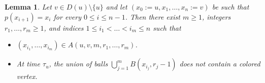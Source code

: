 \documentclass[french]{article}
\newtheorem{lemma}[theorem]{Lemma}
\newcommand{\T}{\mathcal{T}}
\renewcommand{\1}{\mathds{1}}
\begin{document}
\begin{lemma}\label{lemm:descendance1} Let $v\in D(u)\setminus\{u\}$ and let $(x_0:=u,x_1,\dots, x_n:=v)$ be such that $p(x_{i+1})=x_i$ for every $0\le i\le n-1$. Then there exist $m\ge 1$, integers $r_1,\ldots,r_m\ge 1$, and indices $1\le i_1<\ldots <i_m\le n$ such that 
\begin{itemize}
    \item $(x_{i_1},\ldots, x_{i_m})\in A(u,v,m,r_1,\ldots,r_m)$.
    \item At time $\tau_u$, the union of balls $\bigcup_{j=1}^m B(x_{i_j},r_j-1)$ does not contain a colored vertex.
\end{itemize}

\end{lemma}


\end{document}
